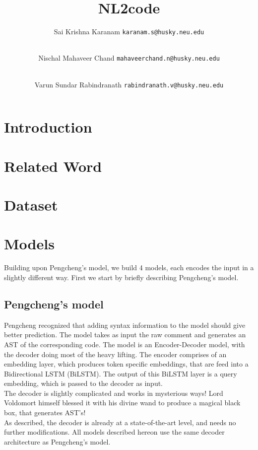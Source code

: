 \documentclass{IEEEtran}
\title{\textbf{NL2code}}
\author{
    Sai Krishna Karanam 
    \texttt{karanam.s@husky.neu.edu}
    \and \\
    Nischal Mahaveer Chand 
    \texttt{mahaveerchand.n@husky.neu.edu}
    \and \\
    Varun Sundar Rabindranath 
    \texttt{rabindranath.v@husky.neu.edu}
}
\date{}
\begin{document}
    \maketitle

    \section{Introduction}
    \blindtext

    \section{Related Word}
    \blindtext

    \section{Dataset}
    \blindtext

    \section{Models}
    Building upon Pengcheng's model, we build 4 models, each encodes the input in a slightly 
    different way. First we start by briefly describing Pengcheng's model.

      \subsection{Pengcheng's model}
      Pengcheng recognized that adding syntax information to the model should give better
      prediction. The model takes as input the raw comment and generates an AST of the 
      corresponding code. The model is an Encoder-Decoder model, with the decoder doing most 
      of the heavy lifting. The encoder comprises of an embedding layer, which produces token
      specific embeddings, that are feed into a Bidirectional LSTM (BiLSTM). The output of this 
      BiLSTM layer is a query embedding, which is passed to the decoder as input. \\

      The decoder is slightly complicated and works in mysterious ways! Lord Voldomort himself
      blessed it with his divine wand to produce a magical black box, that generates
      AST's! \\

      As described, the decoder is already at a state-of-the-art level, and needs no further 
      modifications. All models described hereon use the same decoder architecture as Pengcheng's 
      model.
\end{document}
